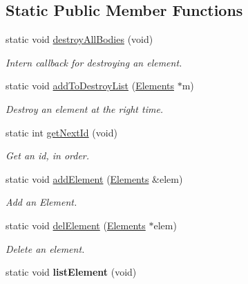 \subsection*{Static Public Member Functions}
\begin{DoxyCompactItemize}
\item 
static void \hyperlink{class_game_ae391a35eb1f970669b0d6b236de4b885}{destroy\-All\-Bodies} (void)
\begin{DoxyCompactList}\small\item\em Intern callback for destroying an element. \end{DoxyCompactList}\item 
static void \hyperlink{class_game_ae3c5dc329506d37d244ef3587ac813af}{add\-To\-Destroy\-List} (\hyperlink{class_elements}{Elements} $\ast$m)
\begin{DoxyCompactList}\small\item\em Destroy an element at the right time. \end{DoxyCompactList}\item 
static int \hyperlink{class_game_aec4cafc10218eb665d67bf027ddbd3f1}{get\-Next\-Id} (void)
\begin{DoxyCompactList}\small\item\em Get an id, in order. \end{DoxyCompactList}\item 
static void \hyperlink{class_game_a10d84bf0157d5b3abf102846d5170af5}{add\-Element} (\hyperlink{class_elements}{Elements} \&elem)
\begin{DoxyCompactList}\small\item\em Add an Element. \end{DoxyCompactList}\item 
static void \hyperlink{class_game_a644e15f76310ed410817e8423ad7a5b2}{del\-Element} (\hyperlink{class_elements}{Elements} $\ast$elem)
\begin{DoxyCompactList}\small\item\em Delete an element. \end{DoxyCompactList}\item 
\hypertarget{class_game_aafc84f0b25d07825f08dffc07af73918}{static void {\bfseries list\-Element} (void)}\label{class_game_aafc84f0b25d07825f08dffc07af73918}


\end{DoxyCompactItemize}
